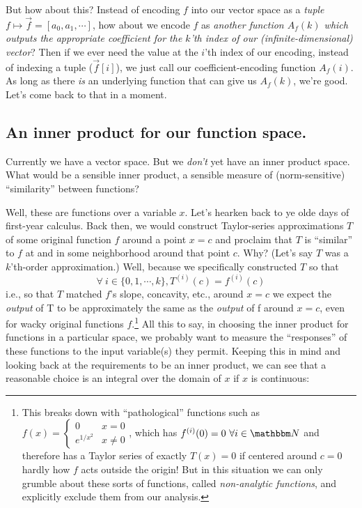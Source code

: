 \documentclass[../main/main.tex]{subfiles}
\begin{document}
But how about this? 
Instead of encoding \(f\) into our vector space as a \emph{tuple}
\(f \mapsto \vec{f} = \left[a_0, a_1, \cdots \right]\), 
how about we encode 
\(f\) as \emph{another function \(A_f(k)\) which
outputs the appropriate coefficient for the \(k\)'th index of
our (infinite-dimensional) vector}?
Then if we ever need the value at the \(i\)'th index of our
encoding, instead of indexing a tuple (\(\vec{f}[i]\)),
we just call our coefficient-encoding function \(A_f(i)\).
As long as there \emph{is} an underlying function that
can give us \(A_f(k)\), we're good. Let's come back to that 
in a moment.\par

\subsection{An inner product for our function space.}

Currently we have a vector space.
But we \emph{don't} yet have an inner product space.
What would be a sensible inner product,
a sensible measure of (norm-sensitive) ``similarity''
between functions?\par

Well, these are functions over a variable \(x\).
Let's hearken back to ye olde days of first-year calculus.
Back then, we would construct Taylor-series approximations \(T\) 
of some original function \(f\) around
a point \(x=c\) and proclaim that \(T\) is ``similar'' to \(f\)
at and in some neighborhood around that point \(c\). 
Why? (Let's say \(T\) was a \(k\)'th-order approximation.)
Well, because we specifically
constructed \(T\) so that
\[\forall \ i \in \{0, 1, \cdots, k\}, T^{(i)}(c) = f^{(i)}(c)\]
\textemdash{} i.e., so that \(T\) matched \(f\)'s slope, concavity, etc., around \(x=c\)
\textemdash{}
we expect the \emph{output} of T to be approximately the same
as the \emph{output} of f around \(x=c\), even for wacky 
original functions \(f\).\footnote{
  This breaks down with ``pathological''
  functions such as
  \(f(x) = 
  \begin{cases}
    0 & x = 0 \\
    e^{1/x^2} & x \neq 0
  \end{cases}
  \),
  which has \(f^{(i)}(0) = 0 \ \forall i \in \domain{N}\)
  and therefore has a Taylor series of exactly \(T(x) = 0\)
  if centered around \(c = 0\) \textemdash{} hardly how \(f\)
  acts outside the origin!
  But in this situation we can only grumble about these sorts of functions,
  called \emph{non-analytic functions},
  and explicitly exclude them from our analysis.
}
All this to say, in choosing the inner product for functions
in a particular space,
we probably want to measure the ``responses'' of these
functions to the input variable(s) they permit.
Keeping this in mind and looking back at the requirements to
be an inner product, we can see that a reasonable choice
is an integral over the domain of \(x\) if \(x\) is continuous:
\end{document}
